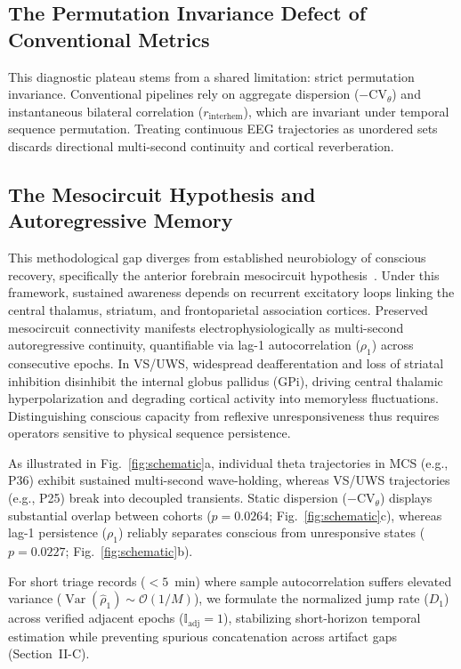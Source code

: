 \documentclass[journal,twoside,web]{ieeecolor}
\begin{document}
\subsection{The Permutation Invariance Defect of Conventional Metrics}
This diagnostic plateau stems from a shared limitation: strict permutation invariance. Conventional pipelines rely on aggregate dispersion ($-\mathrm{CV}_\theta$) and instantaneous bilateral correlation ($r_{\text{interhem}}$), which are invariant under temporal sequence permutation. Treating continuous EEG trajectories as unordered sets discards directional multi-second continuity and cortical reverberation.

\subsection{The Mesocircuit Hypothesis and Autoregressive Memory}
This methodological gap diverges from established neurobiology of conscious recovery, specifically the anterior forebrain mesocircuit hypothesis~\cite{schiff2010recovery}. Under this framework, sustained awareness depends on recurrent excitatory loops linking the central thalamus, striatum, and frontoparietal association cortices. Preserved mesocircuit connectivity manifests electrophysiologically as multi-second autoregressive continuity, quantifiable via lag-1 autocorrelation ($\rho_1$) across consecutive epochs. In VS/UWS, widespread deafferentation and loss of striatal inhibition disinhibit the internal globus pallidus (GPi), driving central thalamic hyperpolarization and degrading cortical activity into memoryless fluctuations. Distinguishing conscious capacity from reflexive unresponsiveness thus requires operators sensitive to physical sequence persistence.

As illustrated in Fig.~\ref{fig:schematic}a, individual theta trajectories in MCS (e.g., P36) exhibit sustained multi-second wave-holding, whereas VS/UWS trajectories (e.g., P25) break into decoupled transients. Static dispersion ($-\mathrm{CV}_\theta$) displays substantial overlap between cohorts ($p = 0.0264$; Fig.~\ref{fig:schematic}c), whereas lag-1 persistence ($\rho_1$) reliably separates conscious from unresponsive states ($p = 0.0227$; Fig.~\ref{fig:schematic}b).

For short triage records ($< 5$~min) where sample autocorrelation suffers elevated variance ($\operatorname{Var}(\hat{\rho}_1) \sim \mathcal{O}(1/M)$), we formulate the normalized jump rate ($D_1$) across verified adjacent epochs ($\mathbb{I}_{\text{adj}} = 1$), stabilizing short-horizon temporal estimation while preventing spurious concatenation across artifact gaps (Section~II-C).
\end{document}

